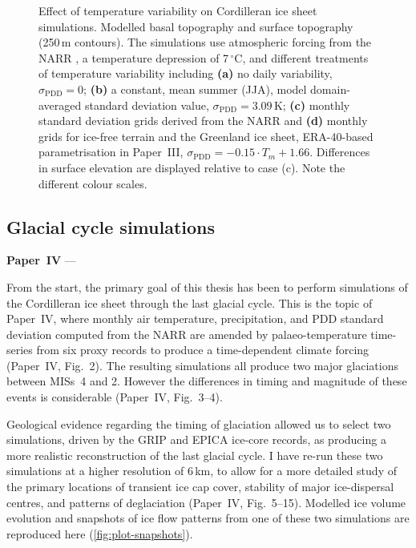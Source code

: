 \documentclass{article}
\newcommand{\sPDD}[0]{\sigma_{\mathrm{PDD}}}
\newcommand{\unit}[1]{\ensuremath{\mathrm{#1}}}
\newcommand{\degree}[0]{\ensuremath{^{\circ}}}
\newcommand{\degC}[0]{\unit{{\degree}C}}
\newcommand{\PSDP}[0]{Paper~III}    %
\newcommand{\CCYC}[0]{Paper~IV}     %
\begin{document}
\begin{figure}
  \centering
  \caption{Effect of temperature variability on Cordilleran ice sheet
           simulations. Modelled basal topography and surface topography
           (250\,m contours). The simulations use atmospheric forcing from the
           NARR \citep{Mesinger.etal.2006}, a temperature depression of
           7\,\degC, and different treatments of temperature variability
           including
           \textbf{(a)} no daily variability, $\sPDD=0$;
           \textbf{(b)} a constant, mean summer (JJA), model domain-averaged
           standard deviation value, $\sPDD=3.09$\,K;
           \textbf{(c)} monthly standard deviation grids derived from the NARR
           and
           \textbf{(d)} monthly grids for ice-free terrain and the
           Greenland ice sheet, ERA-40-based \citep{Uppala.etal.2005}
           parametrisation in \PSDP, ${\sPDD=-0.15\cdot{T_m}+1.66}$.
           Differences in surface elevation are displayed relative to case (c).
           Note the different colour scales.}
  \label{fig:plot-sdeffect}
\end{figure}


\subsection{Glacial cycle simulations}

\noindent\textbf{\CCYC} --- 
\bigskip

From the start, the primary goal of this thesis has been to perform simulations of the Cordilleran ice sheet through the last glacial cycle. This is the topic of \CCYC, where monthly air temperature, precipitation, and PDD standard deviation computed from the NARR are amended by palaeo-temperature time-series from six proxy records to produce a time-dependent climate forcing (\CCYC, Fig.~2). The resulting simulations all produce two major glaciations between MISs~4 and 2. However the differences in timing and magnitude of these events is considerable (\CCYC, Fig.~3--4).

Geological evidence regarding the timing of glaciation allowed us to select two
simulations, driven by the GRIP \citep{Dansgaard.etal.1993} and EPICA \citep{Jouzel.etal.2007} ice-core records, as producing a more realistic reconstruction of the last glacial cycle. I have re-run these two simulations at a higher resolution of 6\,km, to allow for a more detailed study of the primary locations of transient ice cap cover, stability of major ice-dispersal centres, and patterns of deglaciation (\CCYC, Fig.~5--15). Modelled ice volume evolution and snapshots of ice flow patterns from one of these two simulations are reproduced here (\cref{fig:plot-snapshots}).
\end{document}
